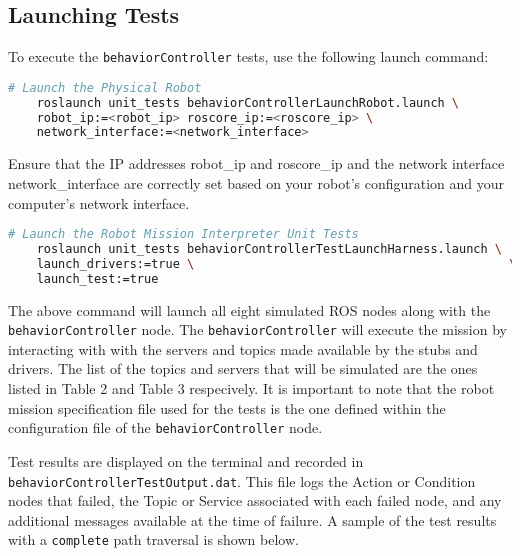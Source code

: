 \documentclass{CSSRforAfrica}
\begin{document}
    
\subsection{Launching Tests}
To execute the \texttt{\small behaviorController} tests, use the following launch command:
\begin{lstlisting}[style=withoutNumbering, language=bash]
    # Launch the Physical Robot
    roslaunch unit_tests behaviorControllerLaunchRobot.launch \
    robot_ip:=<robot_ip> roscore_ip:=<roscore_ip> \
    network_interface:=<network_interface>
\end{lstlisting}

Ensure that the IP addresses robot\_ip and roscore\_ip and the network interface network\_interface are correctly set based on your robot's configuration and your computer's network interface.

\begin{lstlisting}[style=withoutNumbering, language=bash]
# Launch the Robot Mission Interpreter Unit Tests
    roslaunch unit_tests behaviorControllerTestLaunchHarness.launch \
    launch_drivers:=true \                                            \
    launch_test:=true
\end{lstlisting}


The above command will launch all eight simulated ROS nodes along with the \texttt{\small behaviorController} node. The \texttt{\small behaviorController} will execute the mission by interacting with with the servers and topics made available by the stubs and drivers.
The list of the topics and servers that will be simulated are the ones listed in Table 2 and Table 3 respecively. It is important to note that the robot mission specification file used for the tests is the one defined within the configuration file of the \texttt{\small behaviorController} node.

Test results are displayed on the terminal and recorded in \\ \texttt{\small behaviorControllerTestOutput.dat}. This file logs the Action or Condition nodes that failed, the Topic or Service associated with each failed node, and any additional messages available at the time of failure. A sample of the test results with a \texttt{complete} path traversal is shown below.
\end{document}
